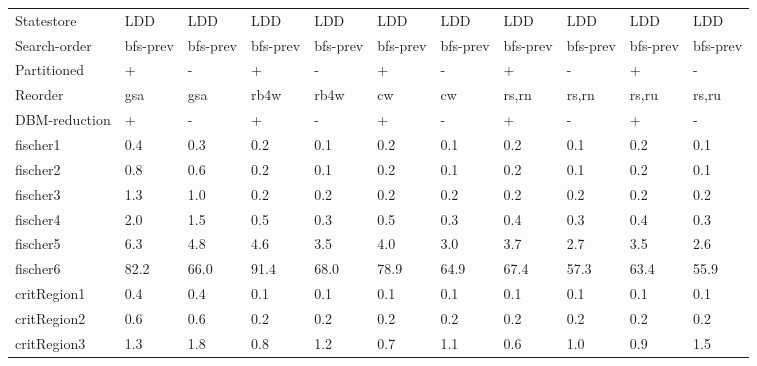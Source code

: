 \begin{table}
\label{fig:time_2}
\begin{adjustbox}{max totalheight=\textheight}
    \begin{tabular}{|l|llllllllll|}
    \hline
     Statestore        & LDD      & LDD      & LDD      & LDD      & LDD      & LDD      & LDD      & LDD      & LDD      & LDD      \\
    Search-order       & bfs-prev & bfs-prev & bfs-prev & bfs-prev & bfs-prev & bfs-prev & bfs-prev & bfs-prev & bfs-prev & bfs-prev \\
    Partitioned        & +        & -        & +        & -        & +        & -        & +        & -        & +        & -        \\
    Reorder            & gsa      & gsa      & rb4w     & rb4w     & cw       & cw       & rs,rn    & rs,rn    & rs,ru    & rs,ru    \\
    DBM-reduction      & +        & -        & +        & -        & +        & -        & +        & -        & +        & -        \\ \hline
    fischer1           & 0.4      & 0.3      & 0.2      & 0.1      & 0.2      & 0.1      & 0.2      & 0.1      & 0.2      & 0.1      \\
    fischer2           & 0.8      & 0.6      & 0.2      & 0.1      & 0.2      & 0.1      & 0.2      & 0.1      & 0.2      & 0.1      \\
    fischer3           & 1.3      & 1.0      & 0.2      & 0.2      & 0.2      & 0.2      & 0.2      & 0.2      & 0.2      & 0.2      \\
    fischer4           & 2.0      & 1.5      & 0.5      & 0.3      & 0.5      & 0.3      & 0.4      & 0.3      & 0.4      & 0.3      \\
    fischer5           & 6.3      & 4.8      & 4.6      & 3.5      & 4.0      & 3.0      & 3.7      & 2.7      & 3.5      & 2.6      \\
    fischer6           & 82.2     & 66.0     & 91.4     & 68.0     & 78.9     & 64.9     & 67.4     & 57.3     & 63.4     & 55.9     \\ \hline
    critRegion1        & 0.4      & 0.4      & 0.1      & 0.1      & 0.1      & 0.1      & 0.1      & 0.1      & 0.1      & 0.1      \\
    critRegion2        & 0.6      & 0.6      & 0.2      & 0.2      & 0.2      & 0.2      & 0.2      & 0.2      & 0.2      & 0.2      \\
    critRegion3        & 1.3      & 1.8      & 0.8      & 1.2      & 0.7      & 1.1      & 0.6      & 1.0      & 0.9      & 1.5      \\

\end{tabular}
\end{adjustbox}
\end{table}
